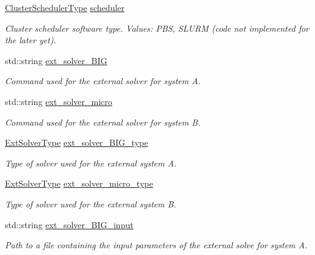 \begin{DoxyCompactItemize}
\item 
\hyperlink{namespacecarl_a67066fdf35a0c326f5147098c0cf45d1}{Cluster\+Scheduler\+Type} \hyperlink{structcarl_1_1feti__setup__init__params_ad1c1983a2374aa46f19ed79f8196f6d6}{scheduler}
\begin{DoxyCompactList}\small\item\em Cluster scheduler software type. {\itshape Values}\+: P\+B\+S, S\+L\+U\+R\+M (code not implemented for the later yet). \end{DoxyCompactList}\item 
std\+::string \hyperlink{structcarl_1_1feti__setup__init__params_a90db585fd2b345de1b58f60986785195}{ext\+\_\+solver\+\_\+\+B\+I\+G}
\begin{DoxyCompactList}\small\item\em Command used for the external solver for system A. \end{DoxyCompactList}\item 
std\+::string \hyperlink{structcarl_1_1feti__setup__init__params_aaa4b53d66e1dde62585701fab931a50c}{ext\+\_\+solver\+\_\+micro}
\begin{DoxyCompactList}\small\item\em Command used for the external solver for system B. \end{DoxyCompactList}\item 
\hyperlink{namespacecarl_a384c8e69965cba9e6e52667c8cefff08}{Ext\+Solver\+Type} \hyperlink{structcarl_1_1feti__setup__init__params_a60ddeeac9b3c334b3f4516dc347affec}{ext\+\_\+solver\+\_\+\+B\+I\+G\+\_\+type}
\begin{DoxyCompactList}\small\item\em Type of solver used for the external system A. \end{DoxyCompactList}\item 
\hyperlink{namespacecarl_a384c8e69965cba9e6e52667c8cefff08}{Ext\+Solver\+Type} \hyperlink{structcarl_1_1feti__setup__init__params_a087f44c8b913718d70c2cd3c06e13262}{ext\+\_\+solver\+\_\+micro\+\_\+type}
\begin{DoxyCompactList}\small\item\em Type of solver used for the external system B. \end{DoxyCompactList}\item 
std\+::string \hyperlink{structcarl_1_1feti__setup__init__params_aea43484d9b7f2f6ab036842ea32a2507}{ext\+\_\+solver\+\_\+\+B\+I\+G\+\_\+input}
\begin{DoxyCompactList}\small\item\em Path to a file containing the input parameters of the external solve for system A. \end{DoxyCompactList}\item 

\end{DoxyCompactItemize}
